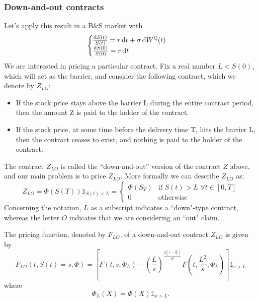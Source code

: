\subsubsection{Down-and-out contracts}
Let's apply this result in a B\&S market with
\begin{equation}
    \begin{cases}
    \frac{\dd S(t)}{S(t)} = r\,\dd t + \sigma\, \dd W^{\mathbb{Q}}(t) \\
    \frac{\dd S(0)}{S(0)} = r\,\dd t
    \end{cases}
\end{equation}
We are interested in pricing a particular contract. Fix a real number $L < S(0)$, which will act as the barrier, and consider the following contract, which we denote by $Z_{LO}$:
\begin{itemize}
    \item If the stock price stays above the barrier L during the entire contract period, then the amount Z is paid to the holder of the contract.
    \item If the stock price, at some time before the delivery time T, hits the barrier L, then the contract ceases to exist, and nothing is paid to the holder of the contract.
\end{itemize}
The contract $Z_{LO}$ is called the “down-and-out” version of the contract $Z$ above, and our main problem is to price $Z_{LO}$. More formally we can describe $Z_{LO}$ as:
\begin{equation}
    Z_{LO} = \Phi(S(T))\mathds{1}_{S(t)<L} = \begin{cases}
    \Phi(S_T) & \text{if } S(t)>L\,\,\forall t\in[0,T] \\
    0 & \text{otherwise}
    \end{cases}
\end{equation}
Concerning the notation, $L$ as a subscript indicates a ``down"-type contract, whereas the letter $O$ indicates that we are considering an ``out" claim.
\begin{theorem}\label{daoprice}
    The pricing function, denoted by $F_{LO}$, of a down-and-out contract $Z_{LO}$ is given by
    \begin{equation}\label{uiuiuiu}
        F_{LO}(t,S(t)=s,\Phi) = \left[F(t,s,\Phi_L) - \left(\dfrac{L}{s}\right)^{\frac{2\left(r-\tfrac{\sigma^2}{2}\right)}{\sigma^2}}F\left(t,\frac{L^2}{s},\Phi_L\right)\right]\mathds{1}_{s>L}
    \end{equation}
    where
    \begin{equation}
        \Phi_L(X) = \Phi(X)\mathds{1}_{x>L}. %
    \end{equation}
\end{theorem}

